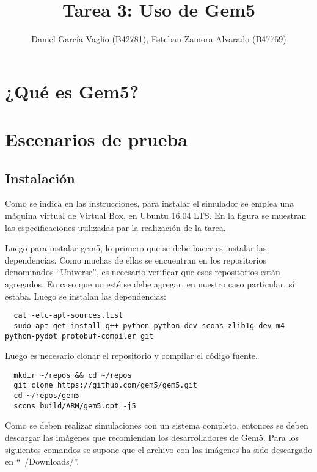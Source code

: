 \documentclass {article}
\begin{document}
\title{Tarea 3: Uso de Gem5}
\author{Daniel García Vaglio (B42781), Esteban Zamora Alvarado (B47769)}

\maketitle

\section{¿Qué es Gem5?}
\cite{opencv} %


\section{Escenarios de prueba}

\subsection{Instalación}
Como se indica en las instrucciones, para instalar el simulador se emplea una máquina virtual de
Virtual Box, en Ubuntu 16.04 LTS. En la figura %
se muestran las especificaciones utilizadas par la realización de la tarea.

 
Luego para instalar gem5, lo primero que se debe hacer es instalar las dependencias. Como muchas de
ellas se encuentran en los repositorios denominados “Universe”, es necesario verificar que esos
repositorios están agregados. En caso que no esté se debe agregar, en nuestro caso particular, sí estaba. Luego se instalan las dependencias:

\begin{lstlisting}
  cat -etc-apt-sources.list
  sudo apt-get install g++ python python-dev scons zlib1g-dev m4  python-pydot protobuf-compiler git
\end{lstlisting}
 
Luego es necesario clonar el repositorio y compilar el código fuente. 

\begin{lstlisting}
  mkdir ~/repos && cd ~/repos
  git clone https://github.com/gem5/gem5.git
  cd ~/repos/gem5
  scons build/ARM/gem5.opt -j5
\end{lstlisting}

Como se deben realizar simulaciones con un sistema completo, entonces se deben descargar las
imágenes que recomiendan los desarrolladores de Gem5. Para los siguientes comandos se supone que el
archivo con las imágenes ha sido descargado en ``~/Downloads/''. 
\end{document}
